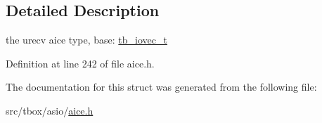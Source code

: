 \subsection{Detailed Description}
the urecv aice type, base\-: \hyperlink{structtb__iovec__t}{tb\-\_\-iovec\-\_\-t} 

Definition at line 242 of file aice.\-h.



The documentation for this struct was generated from the following file\-:\begin{DoxyCompactItemize}
\item 
src/tbox/asio/\hyperlink{aice_8h}{aice.\-h}\end{DoxyCompactItemize}
